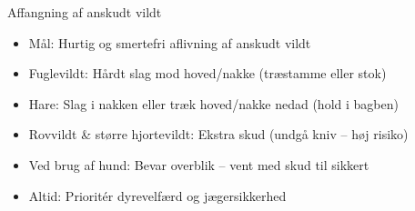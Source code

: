 

\begin{frame}{Affangning af anskudt vildt}
    \begin{itemize}
        \item Mål: Hurtig og smertefri aflivning af anskudt vildt
        \item Fuglevildt: Hårdt slag mod hoved/nakke (træstamme eller stok)
        \item Hare: Slag i nakken eller træk hoved/nakke nedad (hold i bagben)
        \item Rovvildt & større hjortevildt: Ekstra skud (undgå kniv – høj risiko)
        \item Ved brug af hund: Bevar overblik – vent med skud til sikkert
        \item Altid: Prioritér dyrevelfærd og jægersikkerhed
    \end{itemize}
\end{frame}
    
